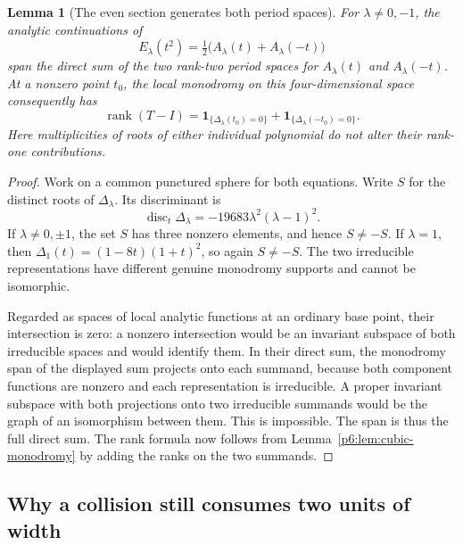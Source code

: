 \documentclass[11pt,a4paper]{article}
\newtheorem{lemma}[theorem]{Lemma}
\theoremstyle{definition}
\theoremstyle{remark}
\numberwithin{equation}{section}
\begin{document}
\begin{lemma}[The even section generates both period spaces]
\label{p6:lem:cubic-directsum}
For $\lambda\ne0,-1$, the analytic continuations of
\[
 E_\lambda(t^2)=\tfrac12\bigl(A_\lambda(t)+A_\lambda(-t)\bigr)
\]
span the direct sum of the two rank-two period spaces for
$A_\lambda(t)$ and $A_\lambda(-t)$. At a nonzero point $t_0$, the local
monodromy on this four-dimensional space consequently has
\[
 \operatorname{rank}(T-I)
 =\boldsymbol{1}_{\{\Delta_\lambda(t_0)=0\}}
  +\boldsymbol{1}_{\{\Delta_\lambda(-t_0)=0\}}.
\]
Here multiplicities of roots of either individual polynomial do not
alter their rank-one contributions.
\end{lemma}
\begin{proof}
Work on a common punctured sphere for both equations. Write $S$ for
the distinct roots of $\Delta_\lambda$. Its discriminant is
\[
 \operatorname{disc}_t\Delta_\lambda
 =-19683\lambda^2(\lambda-1)^2.
\]
If $\lambda\ne0,\pm1$, the set $S$ has three nonzero elements, and
hence $S\ne-S$. If $\lambda=1$, then
$\Delta_1(t)=(1-8t)(1+t)^2$, so again $S\ne-S$.
The two irreducible representations have different genuine monodromy
supports and cannot be isomorphic.

Regarded as spaces of local analytic functions at an ordinary base
point, their intersection is zero: a nonzero intersection would be an
invariant subspace of both irreducible spaces and would identify them.
In their direct sum, the monodromy span of the displayed sum projects
onto each summand, because both component functions are nonzero and
each representation is irreducible. A proper invariant subspace with
both projections onto two irreducible summands would be the graph of
an isomorphism between them. This is impossible. The span is thus the
full direct sum. The rank formula now follows from
Lemma~\ref{p6:lem:cubic-monodromy} by adding the ranks on the two summands.
\end{proof}

\subsection{Why a collision still consumes two units of width}
\end{document}
